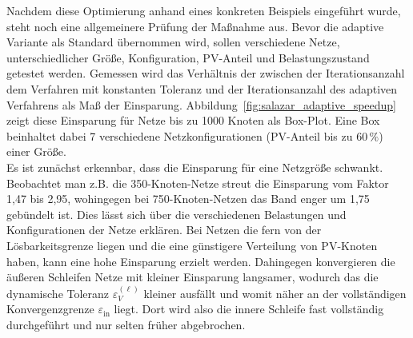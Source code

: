 Nachdem diese Optimierung anhand eines konkreten Beispiels eingeführt wurde, steht noch eine allgemeinere Prüfung der Maßnahme aus.
Bevor die adaptive Variante als Standard übernommen wird, sollen verschiedene Netze, unterschiedlicher Größe, Konfiguration, PV-Anteil und Belastungszustand getestet werden.
Gemessen wird das Verhältnis der zwischen der Iterationsanzahl dem Verfahren mit konstanten Toleranz und der Iterationsanzahl des adaptiven Verfahrens als Maß der Einsparung.
Abbildung~\ref{fig:salazar_adaptive_speedup}  zeigt diese Einsparung für Netze bis zu 1000 Knoten als Box-Plot. 
Eine Box beinhaltet dabei 7 verschiedene Netzkonfigurationen (PV-Anteil bis zu $60\,\%$) einer Größe.\\

Es ist zunächst erkennbar, dass die Einsparung für eine Netzgröße schwankt. 
Beobachtet man z.B. die 350-Knoten-Netze streut die Einsparung vom Faktor 1,47 bis 2,95, wohingegen bei 750-Knoten-Netzen das Band enger um 1,75 gebündelt ist.
Dies lässt sich über die verschiedenen Belastungen und Konfigurationen der Netze erklären.
Bei Netzen die fern von der Lösbarkeitsgrenze liegen und die eine günstigere Verteilung von PV-Knoten haben, kann eine hohe Einsparung erzielt werden.
Dahingegen konvergieren die äußeren Schleifen Netze mit kleiner Einsparung langsamer, wodurch das die dynamische Toleranz  $\varepsilon_V^{(\ell)}$ kleiner ausfällt und womit näher an der vollständigen Konvergenzgrenze $\varepsilon_\mathrm{in}$ liegt.
Dort wird also die innere Schleife fast vollständig durchgeführt und nur selten früher abgebrochen.\\

